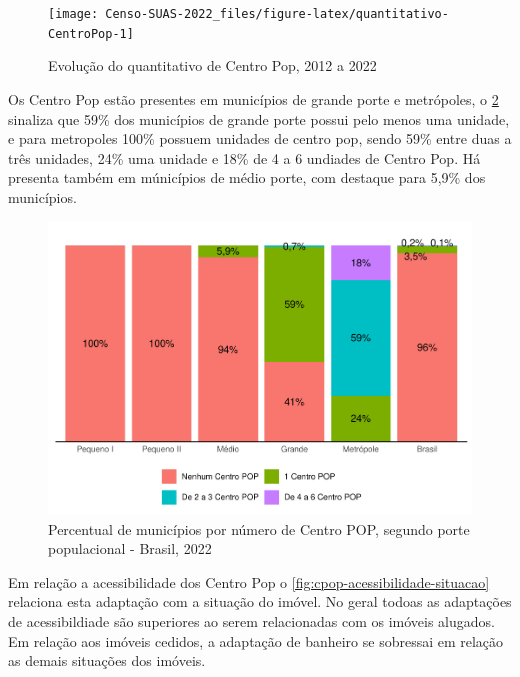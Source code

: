 \documentclass[
  brazilian]{report}
\begin{document}
\begin{figure}
\texttt{[image: Censo-SUAS-2022\_files/figure-latex/quantitativo-CentroPop-1]} \caption[Evolução do quantitativo de Centro Pop, 2012 a 2022]{Evolução do quantitativo de Centro Pop, 2012 a 2022}\label{fig:quantitativo-CentroPop}
\end{figure}

Os Centro Pop estão presentes em municípios de grande porte e
metrópoles, o \cref{fig:cpop-porte} sinaliza que 59\% dos municípios de
grande porte possui pelo menos uma unidade, e para metropoles 100\%
possuem unidades de centro pop, sendo 59\% entre duas a três unidades,
24\% uma unidade e 18\% de 4 a 6 undiades de Centro Pop. Há presenta
também em múnicípios de médio porte, com destaque para 5,9\% dos
municípios.

\begin{figure}
\includegraphics{Censo-SUAS-2022_files/figure-latex/cpop-porte-1} \caption[Percentual de municípios por número de Centro POP, segundo porte populacional - Brasil, 2022]{Percentual de municípios por número de Centro POP, segundo porte populacional - Brasil, 2022}\label{fig:cpop-porte}
\end{figure}

Em relação a acessibilidade dos Centro Pop o
\cref{fig:cpop-acessibilidade-situacao} relaciona esta adaptação com a
situação do imóvel. No geral todoas as adaptações de acessibildiade são
superiores ao serem relacionadas com os imóveis alugados. Em relação aos
imóveis cedidos, a adaptação de banheiro se sobressai em relação as
demais situações dos imóveis.
\end{document}
